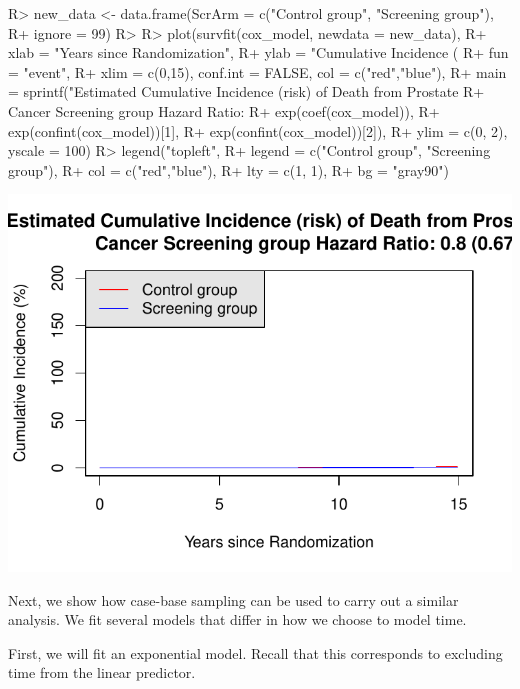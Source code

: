 \documentclass[
]{jss}
\begin{document}
\begin{CodeChunk}

\begin{CodeInput}
R> new_data <- data.frame(ScrArm = c("Control group", "Screening group"),
R+                        ignore = 99)
R> 
R> plot(survfit(cox_model, newdata = new_data),
R+      xlab = "Years since Randomization", 
R+      ylab = "Cumulative Incidence (%
R+      fun = "event",
R+      xlim = c(0,15), conf.int = FALSE, col = c("red","blue"), 
R+      main = sprintf("Estimated Cumulative Incidence (risk) of Death from Prostate 
R+                     Cancer Screening group Hazard Ratio: %
R+                     exp(coef(cox_model)), 
R+                     exp(confint(cox_model))[1], 
R+                     exp(confint(cox_model))[2]),
R+      ylim = c(0, 2), yscale = 100)
R> legend("topleft", 
R+        legend = c("Control group", "Screening group"), 
R+        col = c("red","blue"),
R+        lty = c(1, 1), 
R+        bg = "gray90")
\end{CodeInput}


\begin{center}\includegraphics{../figures/erspc-cox-cif-1} \end{center}

\end{CodeChunk}

Next, we show how case-base sampling can be used to carry out a similar
analysis. We fit several models that differ in how we choose to model
time.

First, we will fit an exponential model. Recall that this corresponds to
excluding time from the linear predictor.
\end{document}
